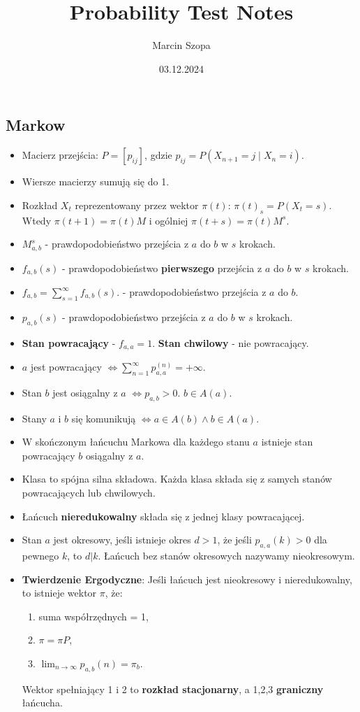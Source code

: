 \documentclass{article}
\title{Probability Test Notes}
\author{Marcin Szopa}
\date{03.12.2024}
\theoremstyle{definition}
\theoremstyle{remark}
\begin{document}
\begin{multicols}{2}
    \section*{Markow}
    \begin{itemize}[itemsep=0pt, left=0pt]
        \item Macierz przejścia: \( P = [p_{ij}] \), gdzie \( p_{ij} = P(X_{n+1} = j \mid X_n = i) \).
        \item Wiersze macierzy sumują się do 1.
        \item Rozkład \(X_t\) reprezentowany przez wektor \(\pi(t)\): \(\pi(t)_s = P(X_t = s)\). Wtedy \(\pi(t + 1) = \pi(t)M\) i ogólniej \(\pi(t + s) = \pi(t)M^s\).
        \item \(M_{a,b}^{s}\) - prawdopodobieństwo przejścia z \(a\) do \(b\) w \(s\) krokach.
        \item \(f_{a,b}(s)\) - prawdopodobieństwo \textbf{pierwszego} przejścia z \(a\) do \(b\) w \(s\) krokach.
        \item \(f_{a,b} = \sum_{s=1}^{\infty} f_{a,b}(s)\). - prawdopodobieństwo przejścia z \(a\) do \(b\).
        \item \(p_{a,b}(s)\) - prawdopodobieństwo przejścia z \(a\) do \(b\) w \(s\) krokach.
        \item \textbf{Stan powracający} - \(f_{a,a} = 1\). \textbf{Stan chwilowy} - nie powracający.
        \item \(a\) jest powracający \(\iff \sum_{n=1}^{\infty} p_{a,a}^{(n)} = +\infty\).
        \item Stan \(b\) jest osiągalny z \(a\) \(\iff p_{a,b} > 0\). \(b \in A(a)\).
        \item Stany \(a\) i \(b\) się komunikują \(\iff a \in A(b) \land b \in A(a)\).
        \item W skończonym łańcuchu Markowa dla każdego stanu \(a\) istnieje stan powracający \(b\) osiągalny z \(a\).
        \item Klasa to spójna silna składowa. Każda klasa składa się z samych stanów powracających lub chwilowych.
        \item Łańcuch \textbf{nieredukowalny} składa się z jednej klasy powracającej.
        \item Stan \(a\) jest okresowy, jeśli istnieje okres \(d > 1\), że jeśli \(p_{a,a}(k) > 0\)
         dla pewnego \(k\), to \(d | k\). Łańcuch bez stanów okresowych nazywamy nieokresowym.
        
        \item \textbf{Twierdzenie Ergodyczne}: Jeśli łańcuch jest nieokresowy i nieredukowalny, to istnieje wektor \(\pi\), że:
        \begin{enumerate}[itemsep=0pt, left=0pt, topsep=0pt]
            \item suma współrzędnych = 1,
            \item \(\pi = \pi P\),
            \item \(\lim_{n \to \infty} p_{a,b}(n) = \pi_b\).
        \end{enumerate}  
        Wektor spełniający 1 i 2 to \textbf{rozkład stacjonarny}, a 1,2,3 \textbf{graniczny} łańcucha.
    \end{itemize}


\end{multicols}
\end{document}
